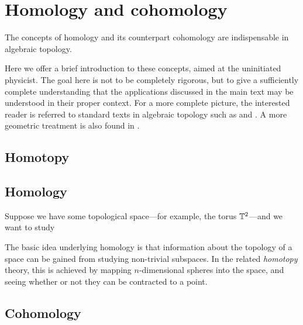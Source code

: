 \chapter{Homology and cohomology}

The concepts of homology and its counterpart cohomology are indispensable in algebraic topology.  %

Here we offer a brief introduction to these concepts, aimed at the uninitiated physicist. The goal here is not to be completely rigorous, but to give a sufficiently complete understanding that the applications discussed in the main text may be understood in their proper context. For a more complete picture, the interested reader is referred to standard texts in algebraic topology such as \cite{Hatcher_algebraic-topology} and \cite{Bredon_topo-geometry}. A more geometric treatment is also found in \cite{Bott-Tu_differential-forms}.


\section{Homotopy}



\section{Homology}

Suppose we have some topological space---for example, the torus $\mathbb{T}^2$---and we want to study %

The basic idea underlying homology is that information about the topology of a space can be gained from studying non-trivial subspaces. In the related \emph{homotopy} theory, this is achieved by mapping $n$-dimensional spheres into the space, and seeing whether or not they can be contracted to a point.


\section{Cohomology}